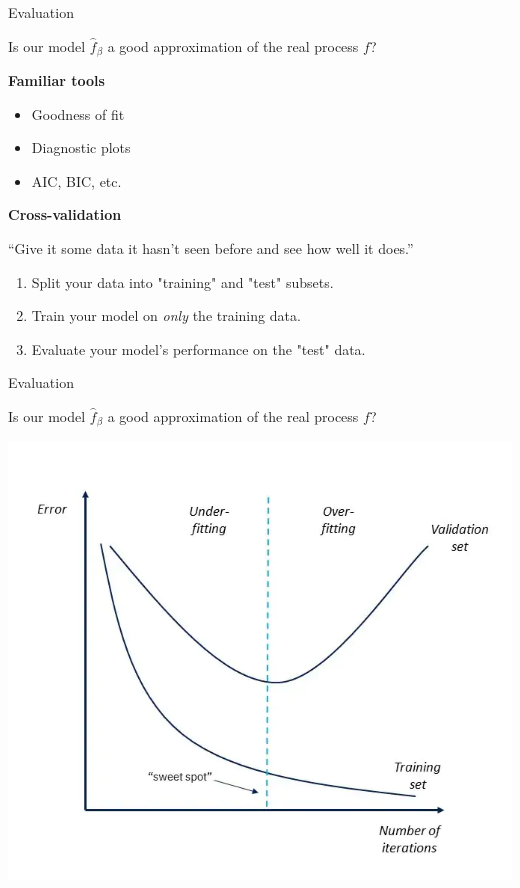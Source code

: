 \begin{frame}[t]{Evaluation}

	\pause

	Is our model $\hat f_\beta$ a good approximation of the real process $f$?


	\pause \bigskip

	\textbf{Familiar tools}

	\begin{itemize}[<+->]
		\item Goodness of fit
		\item Diagnostic plots
		\item AIC, BIC, etc.
	\end{itemize}

	\pause \bigskip

	\textbf{Cross-validation}

	``Give it some data it hasn't seen before and see how well it does.''

	\medskip \pause

	\begin{enumerate}
		\item Split your data into "training" and "test" subsets.
		\item Train your model on \emph{only} the training data.
		\item Evaluate your model's performance on the "test" data.
	\end{enumerate}
\end{frame}

\begin{frame}[t]{Evaluation}

	Is our model $\hat f_\beta$ a good approximation of the real process $f$?

	\begin{center}
		\includegraphics[width=.6\textwidth]{over-under-fitting.png}
	\end{center}

\end{frame}

